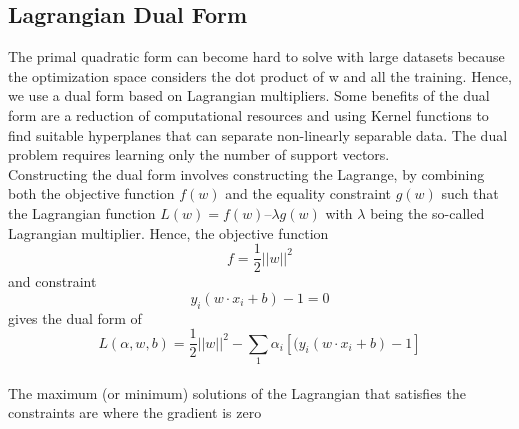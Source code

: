 \documentclass[11pt]{article}
\begin{document}
\subsection{Lagrangian Dual Form}
The primal quadratic form can become hard to solve with large datasets because the optimization space considers the dot product of w and all the training. Hence, we use a dual form based on Lagrangian multipliers\cite{bridgelall2022tutorial}. Some benefits of the dual form are a reduction of computational resources and using Kernel functions to find suitable hyperplanes that can separate non-linearly separable data. The dual problem requires learning only the number of support vectors. \\Constructing the dual form involves constructing the Lagrange, by
combining both the objective function $f(w)$ and the equality constraint $g(w)$ such that the Lagrangian function $L(w) = f(w) – \lambda g(w)$ with $\lambda$ being the so-called Lagrangian multiplier.
Hence, the objective function 
\[f=\frac{1}{2}||w||^2\] and constraint \[ y_i(w\cdot x_i+b)-1=0\] gives the dual form of
\begin{equation}
    \label{function}L(\alpha,w,b)=\frac{1}{2}||w||^2-\sum_1\alpha_i[(y_i(w\cdot x_i+b)-1]
    \end{equation}
\\The maximum (or minimum) solutions of the Lagrangian that satisfies the constraints are where the gradient is zero 

\pagebreak

{


}
\end{document}
